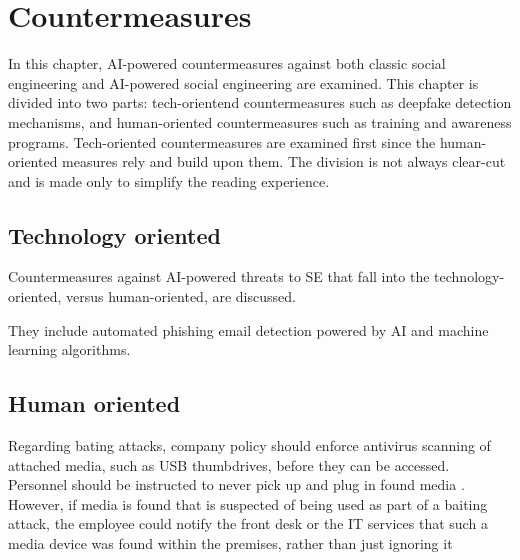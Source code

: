 



\chapter{Countermeasures\label{countermeasures}}
\begin{comment}


\end{comment}

In this chapter, AI-powered countermeasures against both classic social engineering and AI-powered social engineering are examined. This chapter is divided into two parts: tech-orientend countermeasures such as deepfake detection mechanisms, and human-oriented countermeasures such as training and awareness programs. Tech-oriented countermeasures are examined first since the human-oriented measures rely and build upon them. The division is not always clear-cut and is made only to simplify the reading experience.



\section{Technology oriented}
\begin{comment}
    
    - 

\end{comment}

Countermeasures against AI-powered threats to SE that fall into the technology-oriented, versus human-oriented, are discussed.

They include automated phishing email detection powered by AI and machine learning algorithms.


\section{Human oriented}
\begin{comment}
    
    - 

\end{comment}


Regarding bating attacks, company policy should enforce antivirus scanning of attached media, such as USB thumbdrives, before they can be accessed. Personnel should be instructed to never pick up and plug in found media \citep{salahdine_social_2019}. However, if media is found that is suspected of being used as part of a baiting attack, the employee could notify the front desk or the IT services that such a media device was found within the premises, rather than just ignoring it 

